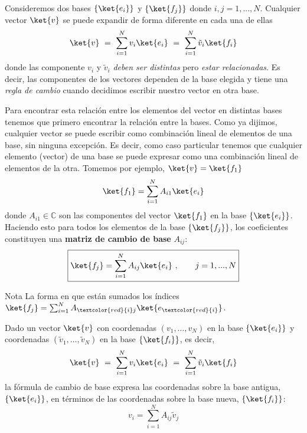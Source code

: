\documentclass[a4paper,11pt]{book} %
\numberwithin{equation}{chapter}
\begin{document}
Consideremos dos bases 
$\{\ket{e_i}\}$ y $\{\ket{f_j}\}$ donde $ i,j = 1,...,N$.
Cualquier vector $\ket{v}$ se puede expandir de forma diferente en cada una de ellas
\begin{equation}
\ket{v} ~=~ \sum_{i=1}^N v_i \ket{e_i} ~=~ \sum_{i=1}^N \tilde v_i \ket{f_i}
\end{equation}
donde las componente $v_i$ y $\tilde v_i$ \textit{deben ser distintas} pero \textit{estar relacionadas}. Es decir, las componentes de los vectores dependen de la base elegida y tiene una \textit{regla de cambio} cuando decidimos escribir nuestro vector en otra base.
		
Para encontrar esta relación entre los elementos del vector en distintas bases tenemos que primero encontrar la relación entre la  bases. Como ya dijimos, cualquier vector se puede escribir como combinación lineal de elementos de una base, sin ninguna excepción. Es decir, como caso particular tenemos que cualquier elemento (vector) de una base se puede expresar como una combinación lineal de elementos de la otra. Tomemos por ejemplo, $\ket{v}= \ket{f_1}$
	\begin{equation}
	\ket{f_1} = \sum_{i=1}^N A_{ i 1} \ket{e_i}
	\end{equation}
donde $A_{ i 1}\in \mathbb{C}$ son las componentes del vector $\ket{f_1}$ en la base $\{\ket{e_i}\}$. Haciendo esto para todos los elementos de la base $\{\ket{f_j}\}$, los coeficientes constituyen una \textbf{matriz de cambio de base} $A_{ij}$:
	\begin{equation} \label{ec_formalismo_cambio_base_base}
	\boxed{\ket{f_j} = \sum_{i=1}^N A_{ i j} \ket{e_i} ~,~~~~~~j=1,..., N}
	\end{equation}
	\begin{mybox_blue}{Nota}
	La forma en que están sumados los índices $\ket{f_j} = \sum_{i=1}^N A_{ \textcolor{red}{i} j} \ket{e_{\textcolor{red}{i}}}$.
	\end{mybox_blue}
Dado un vector $\ket{v}$ con coordenadas $(v_1,\dots,v_N)$ en la base $\{\ket{e_i}\}$ y coordenadas $(\tilde{v}_1,\dots,\tilde{v}_N)$ en la base $\{\ket{f_i}\}$, es decir,
\begin{equation}
\ket{v} ~=~ \sum_{i=1}^N v_i \ket{e_i} ~=~ \sum_{i=1}^N \tilde{v}_i \ket{f_i}
\end{equation}
la fórmula de cambio de base expresa las coordenadas sobre la base antigua, $\{\ket{e_i}\}$, en términos de las coordenadas sobre la base nueva, $\{\ket{f_i}\}$:
	\begin{equation} \label{ec_formalismo_cambio_de_base}
	\boxed{v_i = \sum_{i=1}^N A_{ij} \tilde{v}_j}
	\end{equation}
\end{document}
